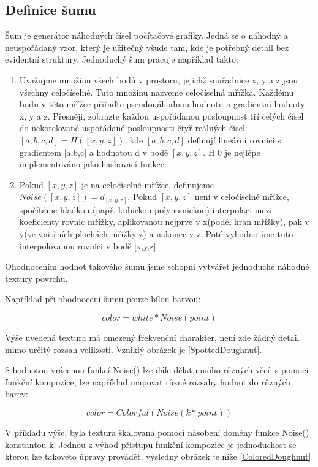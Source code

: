 \subsection{Definice šumu}
Šum je generátor náhodných čísel počítačové grafiky. \cite{PerlinKen} Jedná se o náhodný a neuspořádaný vzor, který je užitečný všude tam, kde je potřebný detail bez evidentní struktury. Jednoduchý šum pracuje například takto:
\begin{enumerate}
	\item Uvažujme množinu všech bodů v prostoru, jejichž souřadnice x, y a z jsou všechny celočíselné. Tuto množinu nazveme celočíselná mřížka. Každému bodu v této mřížce přiřaďte pseudonáhodnou hodnotu a gradientní hodnoty x, y a z. Přesněji, zobrazte každou uspořádanou posloupnost tří celých čísel do nekorelované uspořádané posloupnosti čtyř reálných čísel: $[a,b,c,d] = H([x,y,z])$, kde $[a,b,c,d]$ definují lineární rovnici s gradientem [a,b,c] a hodnotou d v bodě $[x,y,z]$. H 0 je nejlépe implementováno jako hashovací funkce.
	\item Pokud $[x,y,z]$ je na celočíselné mřížce, definujeme $Noise([x,y,z]) = d_{[x,y,z]}$. Pokud $[x,y,z]$ není v celočíselné mřížce, spočítáme hladkou (např. kubickou polynomickou) interpolaci mezi koeficienty rovnic mřížky, aplikovanou nejprve v x(podél hran mřížky), pak v y(ve vnitřních plochách mřížky z) a nakonec v z. Poté vyhodnotíme tuto interpolovanou rovnici v bodě [x,y,z]. 
\end{enumerate}

Ohodnocením hodnot takového šumu jsme schopni vytvářet jednoduché náhodné textury povrchu. \cite{PerlinKen} 

Například při ohodnocení šumu pouze bílou barvou:

\[color = white * Noise(point)\]

Výše uvedená textura má omezený frekvenční charakter, není zde žádný detail mimo určitý rozsah velikosti. Vzniklý obrázek je \ref{SpottedDoughnut}.

S hodnotou vrácenou funkcí Noise() \cite{Perlin2002ImprovingN} lze dále dělat mnoho různých věcí, s pomocí funkční kompozice, lze například mapovat různé rozsahy hodnot do různých barev:

\[color = Colorful(Noise(k * point))\]

V příkladu výše, byla textura škálovaná pomocí násobení domény funkce Noise() konstantou k. Jednou z výhod přístupu funkční kompozice je jednoduchost se kterou lze takovéto úpravy provádět, výsledný obrázek je níže \ref{ColoredDoughnut}.

